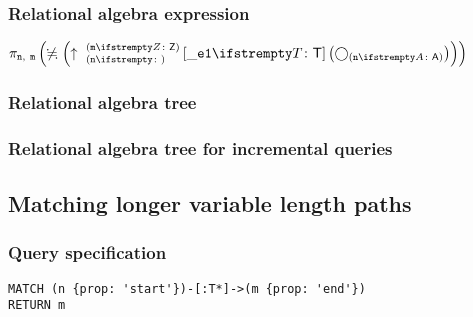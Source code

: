 \subsubsection*{Relational algebra expression}

$\projection{\var{n},~\var{m}} \left(\alldifferent{} \left(\expandout{n}{m}{Z}{\_e1}{T} \left(\getvertices{n}{A}\right)\right)\right)$

\subsubsection*{Relational algebra tree}


\subsubsection*{Relational algebra tree for incremental queries}


\subsection{Matching longer variable length paths}

\subsubsection*{Query specification}

\begin{lstlisting}
MATCH (n {prop: 'start'})-[:T*]->(m {prop: 'end'})
RETURN m
\end{lstlisting}

